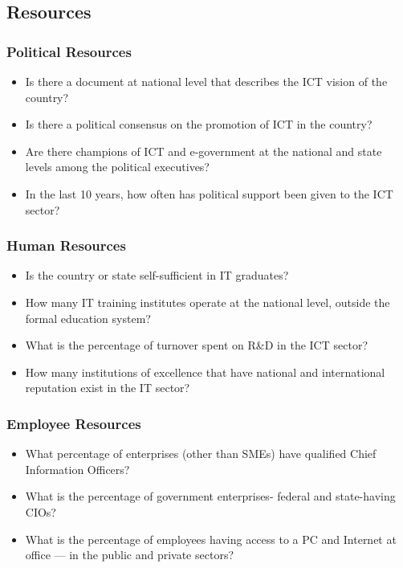 \subsection{Resources}

\subsubsection*{Political Resources}
\begin{itemize}
	\item Is there a document at national level that describes the ICT vision of the country?
	\item Is there a political consensus on the promotion of ICT in the country? 
	\item Are there champions of ICT and e-government at the national and state levels among the political executives?
	\item In the last 10 years, how often has political support been given to the ICT sector?
\end{itemize}

\subsubsection*{Human Resources}
\begin{itemize}
	\item Is the country or state self-sufficient in IT graduates? 

	\item How many IT training institutes operate at the national level, outside the formal education system?

	\item What is the percentage of turnover spent on R\&D in the ICT sector?

	\item How many institutions of excellence that have national and international reputation exist in the IT sector?
\end{itemize}

\subsubsection*{Employee Resources}
\begin{itemize}
	\item What percentage of enterprises (other than SMEs) have qualified Chief Information Officers?
	\item What is the percentage of government enterprises- federal and state-having CIOs?
	\item What is the percentage of employees having access to a PC and Internet at office — in the public and private sectors?
\end{itemize}

